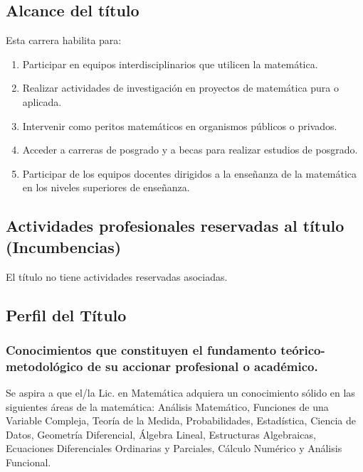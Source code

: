 \documentclass[a4paper, 12pt]{article}
\begin{document}
\subsection{Alcance del título} Esta carrera habilita para:
    \begin{enumerate}

        \item Participar en equipos interdisciplinarios que utilicen la matemática.
        
        \item  Realizar actividades de investigación en proyectos de matemática         pura o aplicada.
       
       \item Intervenir como peritos matemáticos en organismos públicos o privados. 
       
        \item Acceder a carreras de posgrado y a becas para realizar estudios de posgrado.
       
       \item Participar de los equipos docentes dirigidos a la
         enseñanza de la matemática en los niveles superiores de enseñanza.
    
       
         
    \end{enumerate}

\subsection{Actividades profesionales reservadas al título (Incumbencias)}

El título no tiene actividades reservadas asociadas. 
    
\subsection{Perfil del Título}
 


\subsubsection{Conocimientos que constituyen el fundamento teórico-metodoló\-gico de su accionar profesional o académico.}

Se aspira a que el/la Lic. en Matemática adquiera un conocimiento sólido en las siguientes  áreas de
 la matemática: Análisis Matemático, Funciones de una Variable Compleja,   Teoría de la Medida, Probabilidades,  Estadística,  Ciencia de Datos, Geometría Diferencial, Álgebra Lineal, Estructuras Algebraicas, Ecuaciones Diferenciales Ordinarias y Parciales, Cálculo Numérico y Análisis Funcional.
 
\end{document}
